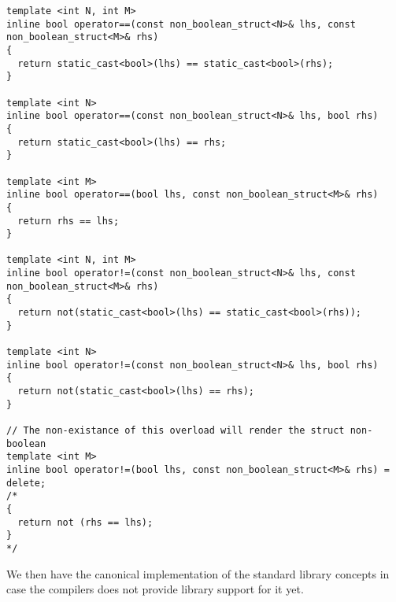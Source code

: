\begin{verbatim}
template <int N, int M>
inline bool operator==(const non_boolean_struct<N>& lhs, const non_boolean_struct<M>& rhs)
{
  return static_cast<bool>(lhs) == static_cast<bool>(rhs);
}

template <int N>
inline bool operator==(const non_boolean_struct<N>& lhs, bool rhs)
{
  return static_cast<bool>(lhs) == rhs;
}

template <int M>
inline bool operator==(bool lhs, const non_boolean_struct<M>& rhs)
{
  return rhs == lhs;
}

template <int N, int M>
inline bool operator!=(const non_boolean_struct<N>& lhs, const non_boolean_struct<M>& rhs)
{
  return not(static_cast<bool>(lhs) == static_cast<bool>(rhs));
}

template <int N>
inline bool operator!=(const non_boolean_struct<N>& lhs, bool rhs)
{
  return not(static_cast<bool>(lhs) == rhs);
}

// The non-existance of this overload will render the struct non-boolean
template <int M>
inline bool operator!=(bool lhs, const non_boolean_struct<M>& rhs) = delete;
/*
{
  return not (rhs == lhs);
}
*/
\end{verbatim}

We then have the canonical implementation of the standard library concepts in case the compilers does not provide library support for it yet.

